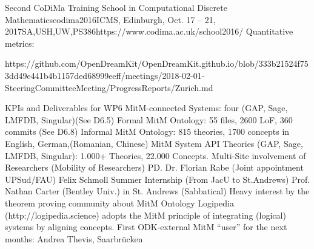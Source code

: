 \begin{Aim 1}
\begin{Aim 2}
\begin{event}{Second CoDiMa Training School in Computational Discrete Mathematics}{codima2016}{ICMS, Edinburgh, Oct. 17 -- 21, 2017}{SA,USH,UW,PS}{38}{6}{https://www.codima.ac.uk/school2016/}
Quantitative metrics:

https://github.com/OpenDreamKit/OpenDreamKit.github.io/blob/333b21524f753dd49e441b4b1157ded68999eeff/meetings/2018-02-01-SteeringCommitteeMeeting/ProgressReports/Zurich.md





KPIs and Deliverables for WP6
MitM-connected Systems: four (GAP, Sage, LMFDB, Singular)(See D6.5)
Formal MitM Ontology: 55 files, 2600 LoF, 360 commits (See D6.8)
Informal MitM Ontology: 815 theories, 1700 concepts in English, German,(Romanian, Chinese)
MitM System API Theories (GAP, Sage, LMFDB, Singular): 1.000+ Theories, 22.000 Concepts.
Multi-Site involvement of Researchers (Mobility of Researchers)
PD. Dr. Florian Rabe (Joint appointment UPSud/FAU)
Felix Schmoll Summer Internship (From JacU to St.Andrews)
Prof. Nathan Carter (Bentley Univ.) in St. Andrews (Sabbatical)
Heavy interest by the theorem proving community about MitM Ontology
Logipedia (http://logipedia.science) adopts the MitM principle of integrating (logical) systems by aligning concepts.
First ODK-external MitM “user” for the next months: Andrea Thevis, Saarbrücken 


\end{event}
\end{Aim 2}
\end{Aim 1}
